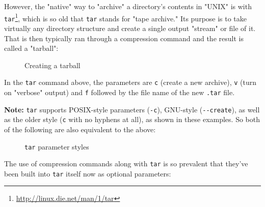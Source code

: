 \documentclass[10pt,american,]{book}
\makeatletter
\newenvironment{Shaded}{\begin{snugshade}}{\end{snugshade}}
\newcommand{\KeywordTok}[1]{\textcolor[rgb]{0.13,0.29,0.53}{\textbf{{#1}}}}
\newcommand{\NormalTok}[1]{{#1}}
\renewcommand{\href}[2]{#2\footnote{\url{#1}}}
\numberwithin{figure}{chapter}
\DeclareRobustCommand{\drcap}[1]{\begin{figure}[H]\caption{#1}\end{figure}}
\DeclareRobustCommand{\drcmd}[1]{\index{commands!#1@\texttt{#1}}}
\renewcommand{\KeywordTok}[1]{{#1}}
\renewcommand{\NormalTok}[1]{{#1}}
\makeatother
\begin{document}
However, the "native" way to "archive" a directory's contents in "UNIX"
is with \href{http://linux.die.net/man/1/tar}{\texttt{tar}}\drcmd{tar},
which is so old that \texttt{tar} stands for "tape archive." Its purpose
is to take virtually any directory structure and create a single output
"stream" or file of it. That is then typically ran through a compression
command and the result is called a "tarball":

\drcap{Creating a tarball}

\begin{Shaded}
\end{Shaded}

In the \texttt{tar} command above, the parameters are \texttt{c} (create
a new archive), \texttt{v} (turn on "verbose" output) and \texttt{f}
followed by the file name of the new
\texttt{.tar}
file.

\textbf{Note:} \texttt{tar} supports POSIX-style parameters
(\texttt{-c}), GNU-style (\texttt{-\/-create}), as well as the older
style (\texttt{c} with no hyphens at all), as shown in these examples.
So both of the following are also equivalent to the above:

\drcap{\texttt{tar} parameter styles}

\begin{Shaded}
\end{Shaded}

The use of compression commands along with \texttt{tar} is so prevalent
that they've been built into \texttt{tar} itself now as optional
parameters:
\end{document}
